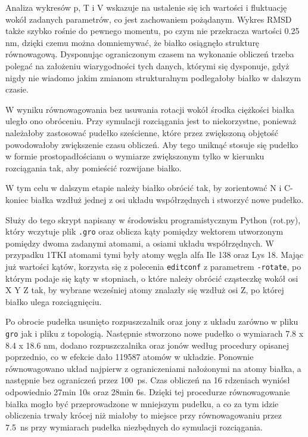 Analiza wykresów p, T i V wskazuje na ustalenie się ich wartości i fluktuację wokół zadanych parametrów, co jest zachowaniem pożądanym. Wykres RMSD także szybko rośnie do pewnego momentu, po czym nie przekracza wartości 0.25 nm, dzięki czemu można domniemywać, że białko osiągnęło strukturę równowagową. Dysponując ograniczonym czasem na wykonanie obliczeń trzeba polegać na założeniu wiarygodności tych danych, którymi się dysponuje, gdyż nigdy nie wiadomo jakim zmianom strukturalnym podlegałoby białko w dalszym czasie.

W wyniku równowagowania bez usuwania rotacji wokół środka ciężkości białka uległo ono obróceniu. Przy symulacji rozciągania jest to niekorzystne, ponieważ należałoby zastosować pudełko sześcienne, które przez zwiększoną objętość powodowałoby zwiększenie czasu obliczeń. Aby tego uniknąć stosuje się pudełko w formie prostopadłościanu o wymiarze zwiększonym tylko w kierunku rozciągania tak, aby pomieścić rozwijane białko. 

W tym celu w dalszym etapie należy białko obrócić tak, by zorientować N i C-koniec białka wzdłuż jednej z osi układu współrzędnych i stworzyć nowe pudełko. 

Służy do tego skrypt napisany w środowisku programistycznym Python (rot.py), który wczytuje plik \texttt{.gro} oraz oblicza kąty pomiędzy wektorem utworzonym pomiędzy dwoma zadanymi atomami, a osiami układu współrzędnych. W przypadku 1TKI atomami tymi były atomy węgla alfa Ile 138 oraz Lys 18. Mając już wartości kątów, korzysta się z polecenia \texttt{editconf} z parametrem \texttt{-rotate}, po którym podaje się kąty w stopniach, o które należy obrócić cząsteczkę wokół osi X Y Z tak, by wybrane wcześniej atomy znalazły się wzdłuż osi Z, po której białko ulega rozciągnięciu. 

Po obrocie pudełka usunięto rozpuszczalnik oraz jony z układu zarówno w pliku \texttt{gro} jak i pliku z topologią. Następnie stworzono nowe pudełko o wymiarach 7.8 x 8.4 x 18.6 nm, dodano rozpuszczalnika oraz jonów według procedury opisanej poprzednio, co w efekcie dało 119587 atomów w układzie. Ponownie równowagowano układ najpierw z ograniczeniami nałożonymi na atomy białka, a następnie bez ograniczeń przez 100~ps. Czas obliczeń na 16 rdzeniach wyniósł odpowiednio 27min 10s oraz 28min 6s. Dzięki tej procedurze równowagowanie białka mogło być przeprowadzone w mniejszym pudełku, a co za tym idzie obliczenia trwały krócej niż miałoby to miejsce przy równowagowaniu przez 7.5~ns przy wymiarach pudełka niezbędnych do symulacji rozciągania. 


